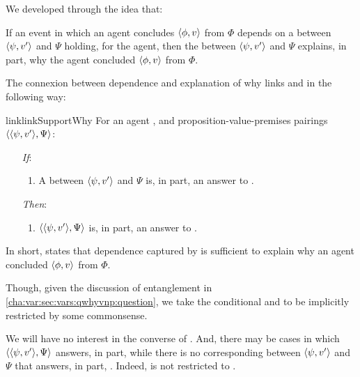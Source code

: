 \begin{note}
  We developed \qWhyV{} through the idea that:

  If an event in which an agent concludes \(\langle \phi, v \rangle\) from \(\Phi\) depends on a  between \(\langle \psi, v' \rangle\) and \(\Psi\) holding, for the agent, then the  between \(\langle \psi, v' \rangle\) and \(\Psi\) explains, in part, why the agent concluded \(\langle \phi, v \rangle\) from \(\Phi\).

  The connexion between dependence and explanation of why links \qWhyV{} and \qWhy{} in the following way:

  \begin{restatable}{link}{linkSupportWhy}
    \label{link:why:support:pvpp}
    For an agent \vAgent{}, and proposition-value-premises pairings \(\langle \langle \psi, v' \rangle, \Psi \rangle\):

    \begin{itemize}
    \item[\emph{If}:]
      \begin{enumerate}[label=\alph*., ref=(\alph*)]
      \item
        A  between \(\langle \psi, v' \rangle\) and \(\Psi\) is, in part, an answer to \qWhyV{}.
      \end{enumerate}
    \item[\emph{Then}:]
      \begin{enumerate}[label=\alph*., ref=(\alph*), resume]
      \item
        \(\langle \langle \psi, v' \rangle, \Psi \rangle\) is, in part, an answer to \qWhy{}.
      \end{enumerate}
    \end{itemize}
    \vspace{-\baselineskip}
  \end{restatable}

  In short, \linkW{} states that dependence captured by \qWhyV{} is sufficient to explain why an agent concluded \(\langle \phi, v \rangle\) from \(\Phi\).
\end{note}

\begin{note}
  Though, given the discussion of entanglement in \autoref{cha:var:sec:vars:qwhyvnp:question}, we take the conditional and to be implicitly restricted by some commonsense.

  We will have no interest in the converse of \linkW{}.
  And, there may be cases in which \(\langle \langle \psi, v' \rangle, \Psi \rangle\) answers, in part, \qWhy{} while there is no corresponding \ros{} between \(\langle \psi, v' \rangle\) and \(\Psi\) that answers, in part, \qWhyV{}.
  Indeed, \qWhy{} is not restricted to .
\end{note}

